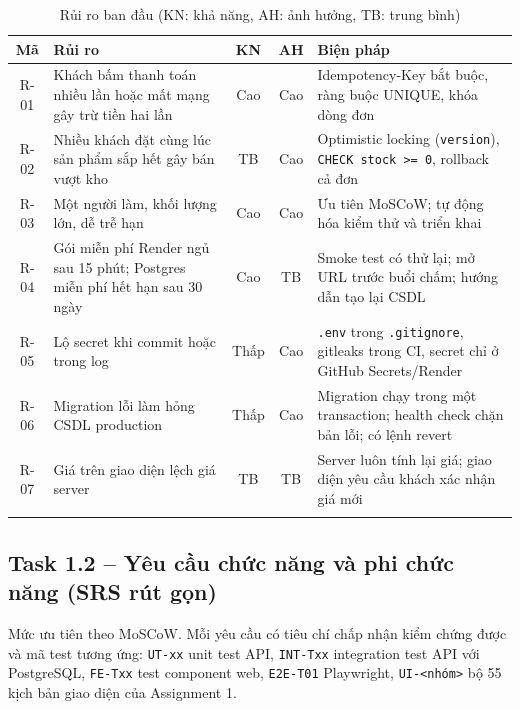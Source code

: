 \documentclass[a4paper]{article}
\newcommand{\st}[1]{\texttt{#1}}
\begin{document}
\begin{longtable}{|c|L{5.4cm}|c|c|L{5.6cm}|}
\hline
\textbf{Mã} & \textbf{Rủi ro} & \textbf{KN} & \textbf{AH} & \textbf{Biện pháp} \\ \hline
\endhead
R-01 & Khách bấm thanh toán nhiều lần hoặc mất mạng gây trừ tiền hai lần & Cao & Cao & Idempotency-Key bắt buộc, ràng buộc UNIQUE, khóa dòng đơn \\ \hline
R-02 & Nhiều khách đặt cùng lúc sản phẩm sắp hết gây bán vượt kho & TB & Cao & Optimistic locking (\st{version}), \st{CHECK stock >= 0}, rollback cả đơn \\ \hline
R-03 & Một người làm, khối lượng lớn, dễ trễ hạn & Cao & Cao & Ưu tiên MoSCoW; tự động hóa kiểm thử và triển khai \\ \hline
R-04 & Gói miễn phí Render ngủ sau 15 phút; Postgres miễn phí hết hạn sau 30 ngày & Cao & TB & Smoke test có thử lại; mở URL trước buổi chấm; hướng dẫn tạo lại CSDL \\ \hline
R-05 & Lộ secret khi commit hoặc trong log & Thấp & Cao & \st{.env} trong \st{.gitignore}, gitleaks trong CI, secret chỉ ở GitHub Secrets/Render \\ \hline
R-06 & Migration lỗi làm hỏng CSDL production & Thấp & Cao & Migration chạy trong một transaction; health check chặn bản lỗi; có lệnh revert \\ \hline
R-07 & Giá trên giao diện lệch giá server & TB & TB & Server luôn tính lại giá; giao diện yêu cầu khách xác nhận giá mới \\ \hline
\caption{Rủi ro ban đầu (KN: khả năng, AH: ảnh hưởng, TB: trung bình)}
\end{longtable}

\subsection{Task 1.2 -- Yêu cầu chức năng và phi chức năng (SRS rút gọn)}
Mức ưu tiên theo MoSCoW. Mỗi yêu cầu có tiêu chí chấp nhận kiểm chứng được và mã test tương ứng: \st{UT-xx} unit test API, \st{INT-Txx} integration test API với PostgreSQL, \st{FE-Txx} test component web, \st{E2E-T01} Playwright, \st{UI-<nhóm>} bộ 55 kịch bản giao diện của Assignment 1.
\end{document}
